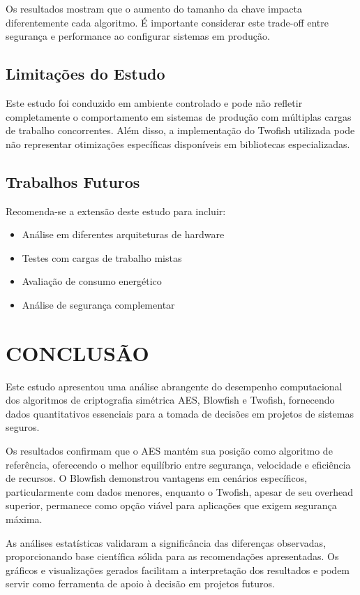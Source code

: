 \documentclass[12pt,a4paper,oneside]{article}
\begin{document}
Os resultados mostram que o aumento do tamanho da chave impacta diferentemente cada algoritmo. É importante considerar este trade-off entre segurança e performance ao configurar sistemas em produção.

\subsection{Limitações do Estudo}

Este estudo foi conduzido em ambiente controlado e pode não refletir completamente o comportamento em sistemas de produção com múltiplas cargas de trabalho concorrentes. Além disso, a implementação do Twofish utilizada pode não representar otimizações específicas disponíveis em bibliotecas especializadas.

\subsection{Trabalhos Futuros}

Recomenda-se a extensão deste estudo para incluir:

\begin{itemize}
    \item Análise em diferentes arquiteturas de hardware
    \item Testes com cargas de trabalho mistas
    \item Avaliação de consumo energético
    \item Análise de segurança complementar
\end{itemize}

\section{CONCLUSÃO}

Este estudo apresentou uma análise abrangente do desempenho computacional dos algoritmos de criptografia simétrica AES, Blowfish e Twofish, fornecendo dados quantitativos essenciais para a tomada de decisões em projetos de sistemas seguros.

Os resultados confirmam que o AES mantém sua posição como algoritmo de referência, oferecendo o melhor equilíbrio entre segurança, velocidade e eficiência de recursos. O Blowfish demonstrou vantagens em cenários específicos, particularmente com dados menores, enquanto o Twofish, apesar de seu overhead superior, permanece como opção viável para aplicações que exigem segurança máxima.

As análises estatísticas validaram a significância das diferenças observadas, proporcionando base científica sólida para as recomendações apresentadas. Os gráficos e visualizações gerados facilitam a interpretação dos resultados e podem servir como ferramenta de apoio à decisão em projetos futuros.
\end{document}
